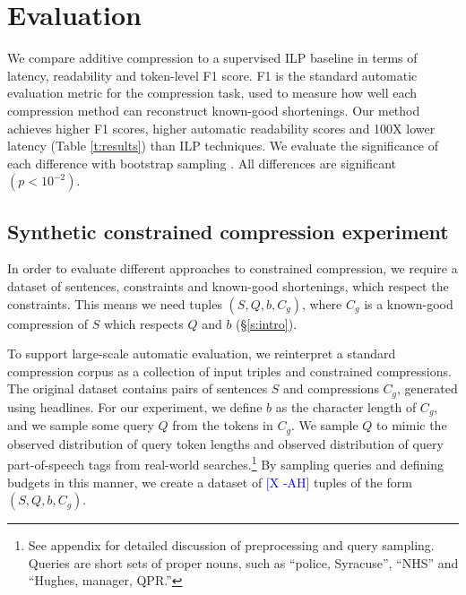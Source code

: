 \documentclass[11pt,a4paper]{article}
\newcommand{\ahcomment}[1]{\textcolor{blue}{[#1 -AH]}}
\begin{document}
\section{Evaluation}\label{s:autoeval}

We compare additive compression to a supervised ILP baseline in terms of latency, readability and token-level F1 score. F1 is the standard automatic evaluation metric for the compression task, used to measure how well each compression method can reconstruct known-good shortenings. Our method achieves higher F1 scores, higher automatic readability scores and 100X lower latency (Table \ref{t:results}) than ILP techniques. We evaluate the significance of each difference with bootstrap sampling \cite{D12-1091}. All differences are significant {\small $(p < 10^{-2})$}. 

\subsection{Synthetic constrained compression experiment}

In order to evaluate different approaches to constrained compression, we require a dataset of sentences, constraints and known-good shortenings, which respect the constraints. This means we need tuples $(S, Q, b, C_g)$, where $C_g$ is a known-good compression of $S$ which respects $Q$ and $b$ (\S\ref{s:intro}).

To support large-scale automatic evaluation, we reinterpret a standard compression corpus \cite{filippova2013overcoming}
as a collection of input triples and constrained compressions. The original dataset contains pairs of sentences $S$ and compressions $C_g$, generated using headlines. For our experiment, we define $b$ as the character length of $C_g$, and we sample some query $Q$ from the tokens in $C_g$. We sample $Q$ to mimic the observed distribution of query token lengths \cite{Jansen2000RealLR} and observed distribution of query part-of-speech tags \cite{Barr2008TheLS} from real-world searches.\footnote{See appendix for detailed discussion of preprocessing and query sampling. Queries are short sets of proper nouns, such as ``police, Syracuse'', ``NHS'' and ``Hughes, manager, QPR.'' } By sampling queries and defining budgets in this manner, we create a dataset of \ahcomment{X} tuples of the form $(S,Q,b,C_g)$.
\end{document}
